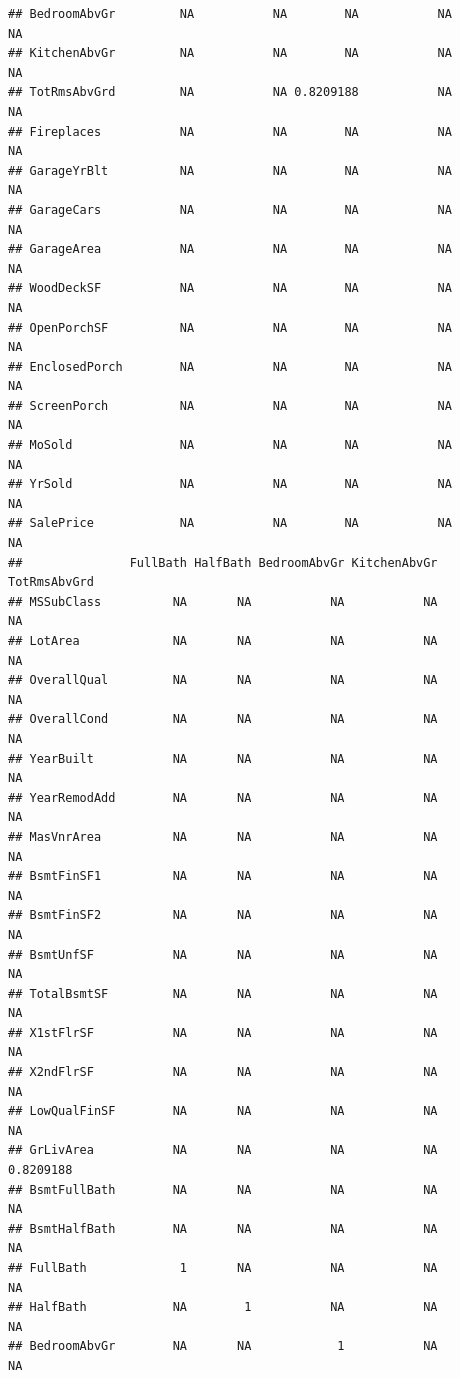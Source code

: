 \documentclass[
]{article}
\begin{document}
\begin{verbatim}
## BedroomAbvGr         NA           NA        NA           NA           NA
## KitchenAbvGr         NA           NA        NA           NA           NA
## TotRmsAbvGrd         NA           NA 0.8209188           NA           NA
## Fireplaces           NA           NA        NA           NA           NA
## GarageYrBlt          NA           NA        NA           NA           NA
## GarageCars           NA           NA        NA           NA           NA
## GarageArea           NA           NA        NA           NA           NA
## WoodDeckSF           NA           NA        NA           NA           NA
## OpenPorchSF          NA           NA        NA           NA           NA
## EnclosedPorch        NA           NA        NA           NA           NA
## ScreenPorch          NA           NA        NA           NA           NA
## MoSold               NA           NA        NA           NA           NA
## YrSold               NA           NA        NA           NA           NA
## SalePrice            NA           NA        NA           NA           NA
##               FullBath HalfBath BedroomAbvGr KitchenAbvGr TotRmsAbvGrd
## MSSubClass          NA       NA           NA           NA           NA
## LotArea             NA       NA           NA           NA           NA
## OverallQual         NA       NA           NA           NA           NA
## OverallCond         NA       NA           NA           NA           NA
## YearBuilt           NA       NA           NA           NA           NA
## YearRemodAdd        NA       NA           NA           NA           NA
## MasVnrArea          NA       NA           NA           NA           NA
## BsmtFinSF1          NA       NA           NA           NA           NA
## BsmtFinSF2          NA       NA           NA           NA           NA
## BsmtUnfSF           NA       NA           NA           NA           NA
## TotalBsmtSF         NA       NA           NA           NA           NA
## X1stFlrSF           NA       NA           NA           NA           NA
## X2ndFlrSF           NA       NA           NA           NA           NA
## LowQualFinSF        NA       NA           NA           NA           NA
## GrLivArea           NA       NA           NA           NA    0.8209188
## BsmtFullBath        NA       NA           NA           NA           NA
## BsmtHalfBath        NA       NA           NA           NA           NA
## FullBath             1       NA           NA           NA           NA
## HalfBath            NA        1           NA           NA           NA
## BedroomAbvGr        NA       NA            1           NA           NA

\end{verbatim}
\end{document}
